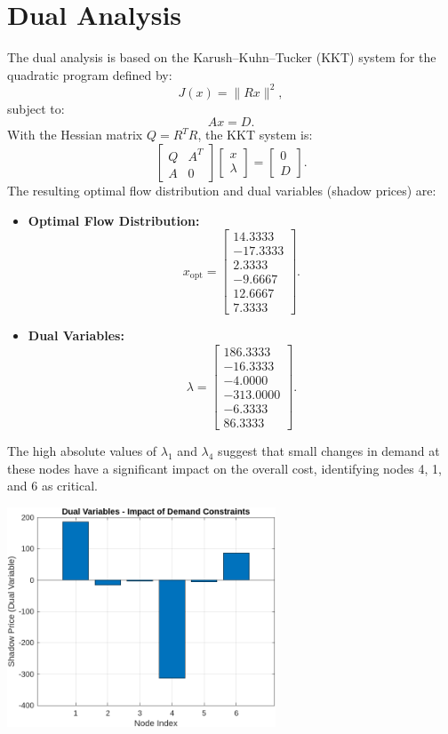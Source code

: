 \documentclass{article}
\begin{document}
\section{Dual Analysis}
The dual analysis is based on the Karush–Kuhn–Tucker (KKT) system for the quadratic program defined by:
\[
J(x) = \|Rx\|^2,
\]
subject to:
\[
Ax = D.
\]
With the Hessian matrix \( Q = R^T R \), the KKT system is:
\[
\begin{bmatrix} Q & A^T \\ A & 0 \end{bmatrix}
\begin{bmatrix} x \\ \lambda \end{bmatrix} =
\begin{bmatrix} 0 \\ D \end{bmatrix}.
\]
The resulting optimal flow distribution and dual variables (shadow prices) are:
\begin{itemize}
    \item \textbf{Optimal Flow Distribution:}
    \[
    x_{\text{opt}} = \begin{bmatrix} 14.3333 \\ -17.3333 \\ 2.3333 \\ -9.6667 \\ 12.6667 \\ 7.3333 \end{bmatrix}.
    \]
    \item \textbf{Dual Variables:}
    \[
    \lambda = \begin{bmatrix} 186.3333 \\ -16.3333 \\ -4.0000 \\ -313.0000 \\ -6.3333 \\ 86.3333 \end{bmatrix}.
    \]
\end{itemize}
The high absolute values of \(\lambda_1\) and \(\lambda_4\) suggest that small changes in demand at these nodes have a significant impact on the overall cost, identifying nodes 4, 1, and 6 as critical.


\begin{center}
\includegraphics[width=0.6\textwidth]{images/dual variables.png}
\end{center}
\end{document}
